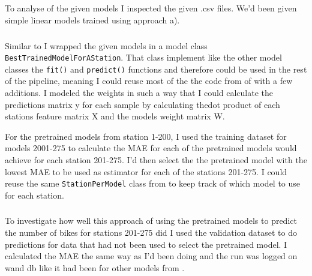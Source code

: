 \documentclass[a4paper]{article}
\begin{document}
    \subsection*{}
    \subsubsection*{}
    To analyse of the given models I inspected the given .csv files. We'd been given simple linear models trained using approach
    a).
    \subsubsection*{}

    Similar to  I wrapped the given models in a model class \texttt{BestTrainedModelForAStation}.
    That class implement like the other model classes the \texttt{fit()} and \texttt{predict()} functions and therefore
    could be used in the rest of the pipeline, meaning I could reuse most of the the code from  of
     with a few additions. I modeled the weights in such a way that
    I could calculate the predictions matrix y for each sample by calculating thedot product of each stations feature matrix X
    and the models weight matrix W.

    For the pretrained models from station 1-200, I used the training dataset for models 2001-275 to calculate the MAE for
    each of the pretrained models would achieve for each station 201-275. I'd then select the the pretrained model with
    the lowest MAE to be used as estimator for each of the stations 201-275. I could reuse the same \texttt{StationPerModel}
    class from  to keep track of which model to use for each station.

    \subsubsection*{}

    To investigate how well this approach of using the pretrained models to predict the number of bikes for stations 201-275
    did I used the validation dataset to do predictions for data that had not been used to select the pretrained model.
    I calculated the MAE the same way as I'd been doing and the run was logged on wand db like it had been
    for other models from .
\end{document}
